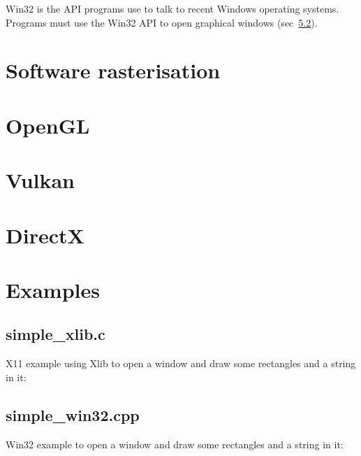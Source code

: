 \documentclass{article}
\begin{document}
Win32 is the API programs use to talk to recent Windows operating systems.
Programs must use the Win32 API to open graphical windows
(sec~\ref{subsec:simple_win32.cpp}).


\section{Software rasterisation}
\label{sec:software-rasterisation}


\section{OpenGL}
\label{sec:opengl}


\section{Vulkan}
\label{sec:vulkan}


\section{DirectX}
\label{sec:directx}


\section{Examples}
\label{sec:examples}

\subsection{simple\_xlib.c}
\label{subsec:simple_xlib.c}

X11 example using Xlib to open a window and draw some rectangles and a string
in it:



\subsection{simple\_win32.cpp}
\label{subsec:simple_win32.cpp}

Win32 example to open a window and draw some rectangles and a string in it:


\end{document}
